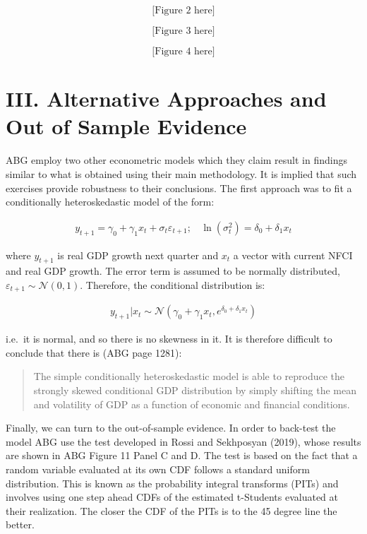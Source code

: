\documentclass[
  11pt,
]{article}
\begin{document}
\[
\text{[Figure 2 here]}
\]

\[
\text{[Figure 3 here]}
\]

\[
\text{[Figure 4 here]}
\]

\hypertarget{iii.-alternative-approaches-and-out-of-sample-evidence}{%
\section{III. Alternative Approaches and Out of Sample
Evidence}\label{iii.-alternative-approaches-and-out-of-sample-evidence}}

ABG employ two other econometric models which they claim result in
findings similar to what is obtained using their main methodology. It is
implied that such exercises provide robustness to their conclusions. The
first approach was to fit a conditionally heteroskedastic model of the
form:

\begin{align}
y_{t+1} = \gamma_0 + \gamma_1 x_t + \sigma_t\varepsilon_{t+1}; \ \ \ \ \ln(\sigma^2_t) = \delta_0 + \delta_1 x_t
\end{align}

where \(y_{t+1}\) is real GDP growth next quarter and \(x_t\) a vector
with current NFCI and real GDP growth. The error term is assumed to be
normally distributed, \(\varepsilon_{t+1} \sim \mathcal{N}(0,1)\).
Therefore, the conditional distribution is:

\begin{align}
y_{t+1}|x_t \sim \mathcal{N}(\gamma_0 + \gamma_1 x_t, e^{\delta_0 + \delta_1 x_t})
\end{align}

i.e.~it is normal, and so there is no skewness in it. It is therefore
difficult to conclude that there is (ABG page 1281):

\begin{quote}
The simple conditionally heteroskedastic model is able to reproduce the
strongly skewed conditional GDP distribution by simply shifting the mean
and volatility of GDP as a function of economic and financial
conditions.
\end{quote}

Finally, we can turn to the out-of-sample evidence. In order to
back-test the model ABG use the test developed in Rossi and Sekhposyan
(2019), whose results are shown in ABG Figure 11 Panel C and D. The test
is based on the fact that a random variable evaluated at its own CDF
follows a standard uniform distribution. This is known as the
probability integral transforms (PITs) and involves using one step ahead
CDFs of the estimated t-Students evaluated at their realization. The
closer the CDF of the PITs is to the 45 degree line the better.
\end{document}
